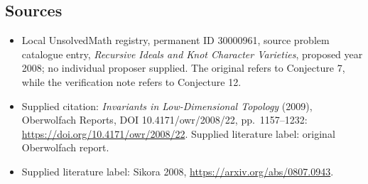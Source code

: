\documentclass[11pt]{article}
\begin{document}
\subsection{Sources}
\begin{itemize}\item Local UnsolvedMath registry, permanent ID 30000961, source problem catalogue entry, \emph{Recursive Ideals and Knot Character Varieties}, proposed year 2008; no individual proposer supplied. The original refers to Conjecture 7, while the verification note refers to Conjecture 12.\item Supplied citation: \emph{Invariants in Low-Dimensional Topology} (2009), Oberwolfach Reports, DOI 10.4171/owr/2008/22, pp.\ 1157--1232: \url{https://doi.org/10.4171/owr/2008/22}. Supplied literature label: original Oberwolfach report.\item Supplied literature label: Sikora 2008, \url{https://arxiv.org/abs/0807.0943}.\end{itemize}
\end{document}
